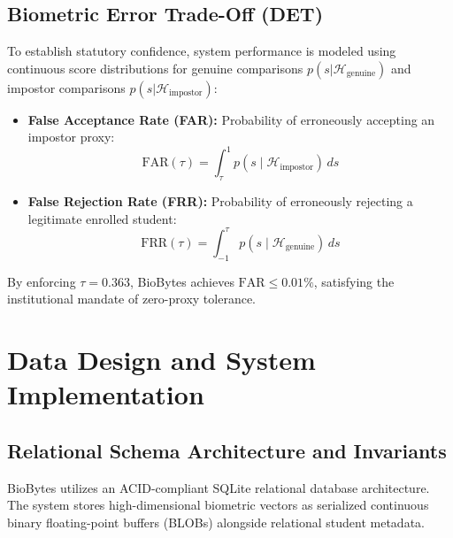 \documentclass[12pt,a4paper,oneside]{report}
\begin{document}
\section{Biometric Error Trade-Off (DET)}
To establish statutory confidence, system performance is modeled using continuous score distributions for genuine comparisons $p(s | \mathcal{H}_{\text{genuine}})$ and impostor comparisons $p(s | \mathcal{H}_{\text{impostor}})$:
\begin{itemize}
    \item \textbf{False Acceptance Rate (FAR):} Probability of erroneously accepting an impostor proxy:
    \begin{equation}
    \text{FAR}(\tau) = \int_{\tau}^{1} p(s \mid \mathcal{H}_{\text{impostor}}) \, ds
    \end{equation}
    \item \textbf{False Rejection Rate (FRR):} Probability of erroneously rejecting a legitimate enrolled student:
    \begin{equation}
    \text{FRR}(\tau) = \int_{-1}^{\tau} p(s \mid \mathcal{H}_{\text{genuine}}) \, ds
    \end{equation}
\end{itemize}
By enforcing $\tau = 0.363$, BioBytes achieves $\text{FAR} \leq 0.01\%$, satisfying the institutional mandate of zero-proxy tolerance.

\chapter{Data Design and System Implementation}

\section{Relational Schema Architecture and Invariants}
BioBytes utilizes an ACID-compliant SQLite relational database architecture. The system stores high-dimensional biometric vectors as serialized continuous binary floating-point buffers (BLOBs) alongside relational student metadata.
\end{document}
